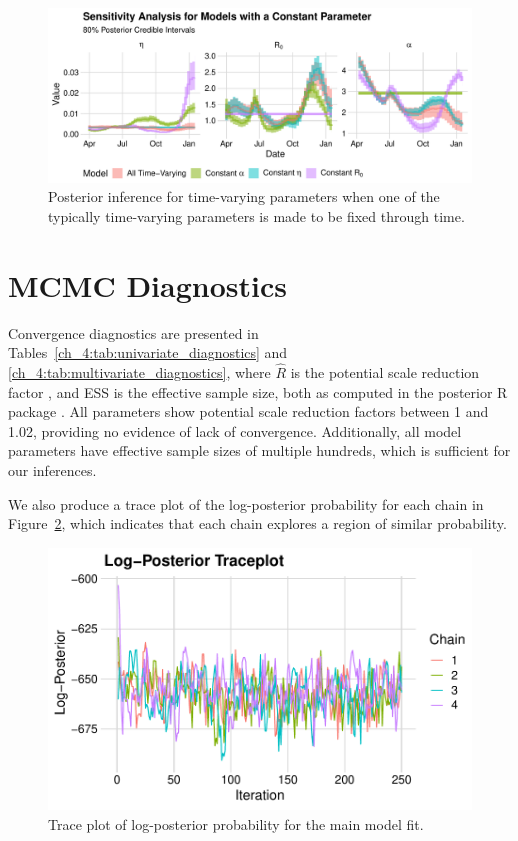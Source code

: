 \begin{figure}[htbp]
    \centering
    \includegraphics[width=1.0\columnwidth]{compare_constant_time_varying_inference_plot}
    \caption{Posterior inference for time-varying parameters when one of the typically time-varying parameters is made to be fixed through time.}
    \label{ch_4:fig:compare_constant_time_varying_inference_plot}
\end{figure}

\section{MCMC Diagnostics}
\label{ch_4:sec:convergence-diagnostics}

Convergence diagnostics are presented in Tables~\ref{ch_4:tab:univariate_diagnostics} and \ref{ch_4:tab:multivariate_diagnostics}, where $\hat{R}$ is the potential scale reduction factor \citep{Vehtari2021}, and ESS is the effective sample size, both as computed in the posterior R package \citep{posteriorPackage}.
All parameters show potential scale reduction factors between 1 and 1.02, providing no evidence of lack of convergence.
Additionally, all model parameters have effective sample sizes of multiple hundreds, which is sufficient for our inferences.

We also produce a trace plot of the log-posterior probability for each chain in Figure~\ref{ch_4:fig:lp_trace_plot}, which indicates that each chain explores a region of similar probability.




\begin{figure}[htbp]
    \centering
    \includegraphics[width=1.0\columnwidth]{lp_trace_plot}
    \caption{Trace plot of log-posterior probability for the main model fit.}
    \label{ch_4:fig:lp_trace_plot}
\end{figure}


